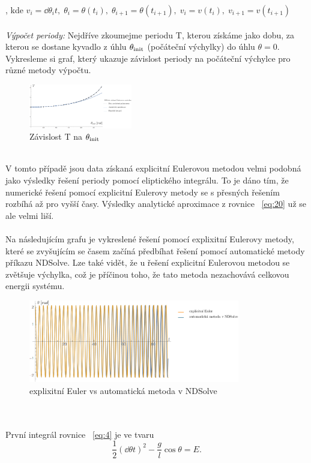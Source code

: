 \documentclass[reqno, a4paper]{amsart}
\begin{document}
, kde $ v_{i}=\dd{\theta_{i}}{t},\; \theta_{i}=\theta(t_{i}),\;\theta_{i+1}=\theta(t_{i+1}),\;v_{i}=v(t_{i}),\;v_{i+1}=v(t_{i+1})$
\\
\\
\textit{Výpočet periody:} Nejdříve zkoumejme periodu T, kterou získáme jako dobu, za kterou se dostane kyvadlo z úhlu $\theta_{\mathrm{init}}$ (počáteční výchylky) do úhlu $\theta=0$. Vykresleme si graf, který ukazuje závislost periody na počáteční výchylce pro různé metody výpočtu.
\begin{figure}[h]
	\centering
	\includegraphics[width=0.4\textwidth]{graf1}
	\caption{Závislost T na $\theta_{\mathrm{init}}$}  
\end{figure}
\\
V tomto případě jsou data získaná explicitní Eulerovou metodou velmi podobná jako výsledky řešení periody pomocí eliptického integrálu. To je dáno tím, že numerické řešení pomocí explicitní Eulerovy metody se s přesných řešením rozbíhá až pro vyšší časy. Výsledky analytické aproximace z rovnice ~\eqref{eq:20} už se ale velmi liší.
\\
\\
Na následujícím grafu je vykreslené řešení pomocí explixitní Eulerovy metody, které se zvyšujícím se časem začíná předbíhat řešení pomocí automatické metody příkazu NDSolve. Lze také vidět, že u řešení explicitní Eulerovou metodou se zvětšuje výchylka, což je příčinou toho, že tato metoda nezachovává celkovou energii systému.
\begin{figure}[h]
	\centering
	\includegraphics[width=0.82\textwidth]{vs}
	\caption{explixitní Euler vs automatická metoda v NDSolve}  
\end{figure}
\\
\\
První integrál rovnice ~\eqref{eq:4} je ve tvaru
\begin{equation}
	\frac{1}{2}
	\left(
	\dd{\theta}{t}
	\right)^2
	-
	\frac{g}{l}
	\cos \theta
	=
	E
	.
\end{equation}
\end{document}
